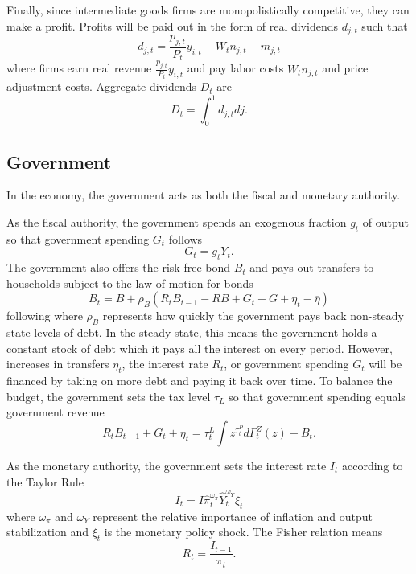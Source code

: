 Finally, since intermediate goods firms are monopolistically competitive, they can make a profit. Profits will be paid out in the form of real dividends $d_{j, t}$ such that
\begin{equation*}
    d_{j, t} = \frac{p_{j, t}}{P_t} y_{i, t} - W_t n_{j, t} - m_{j, t}
\end{equation*}
where firms earn real revenue $\frac{p_{j, t}}{P_t} y_{i, t}$ and pay labor costs $W_t n_{j, t}$ and price adjustment costs. Aggregate dividends $D_t$ are
\begin{equation*}
    D_t = \int_0^1 d_{j, t} dj.
\end{equation*}


\subsection{Government}

In the economy, the government acts as both the fiscal and monetary authority.

As the fiscal authority, the government spends an exogenous fraction $g_t$ of output so that government spending $G_t$ follows
\begin{equation*}
    G_t = g_t Y_t.
\end{equation*}
The government also offers the risk-free bond $B_t$ and pays out transfers to households subject to the law of motion for bonds
\begin{equation*}
    B_t = \overline{B} + \rho_B \left(R_t B_{t-1} - \overline{R} \overline{B} + G_t - \overline{G} + \eta_t - \overline{\eta}\right)
\end{equation*}
following \textcite{auclert2024intertemporal} where $\rho_B$ represents how quickly the government pays back non-steady state levels of debt. In the steady state, this means the government holds a constant stock of debt which it pays all the interest on every period. However, increases in transfers $\eta_t$, the interest rate $R_t$, or government spending $G_t$ will be financed by taking on more debt and paying it back over time. To balance the budget, the government sets the tax level $\tau_L$ so that government spending equals government revenue
\begin{equation*}
    R_t B_{t - 1} + G_t + \eta_t = \tau_t^L \int z^{\tau_t^P} d \Gamma_t^Z (z) + B_t.
\end{equation*}

As the monetary authority, the government sets the interest rate $I_t$ according to the Taylor Rule
\begin{equation*}
    I_t = \overline{I} \hat{\pi}_t^{\omega_\pi} \hat{Y}_t^{\omega_Y} \xi_t
\end{equation*}
where $\omega_\pi$ and $\omega_Y$ represent the relative importance of inflation and output stabilization and $\xi_t$ is the monetary policy shock. The Fisher relation means
\begin{equation*}
    R_t = \frac{I_{t - 1}}{\pi_t}.
\end{equation*}


